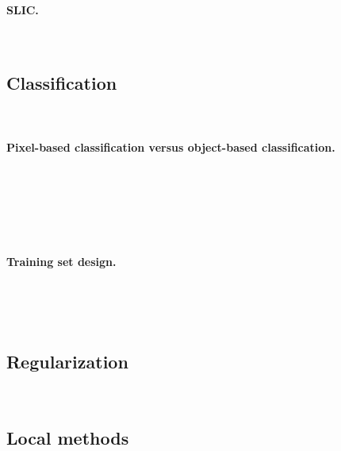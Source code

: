 \paragraph{SLIC. \\}~\vspace*{-1cm}
~\vspace*{-1cm}
~\vspace*{-1cm}

\subsection{Classification}~\vspace*{-1cm}
\paragraph{Pixel-based classification versus object-based classification. \\}~\vspace*{-1cm}

~\vspace*{-1cm}
~\vspace*{-1cm}

~\vspace*{-1cm}
~\vspace*{-1cm}

\paragraph{Training set design. \\}~\vspace*{-1cm}

~\vspace*{-1cm}
~\vspace*{-1cm}

\subsection{Regularization}~\vspace*{-1cm}
\subsection{Local methods}~\vspace*{-1cm}

